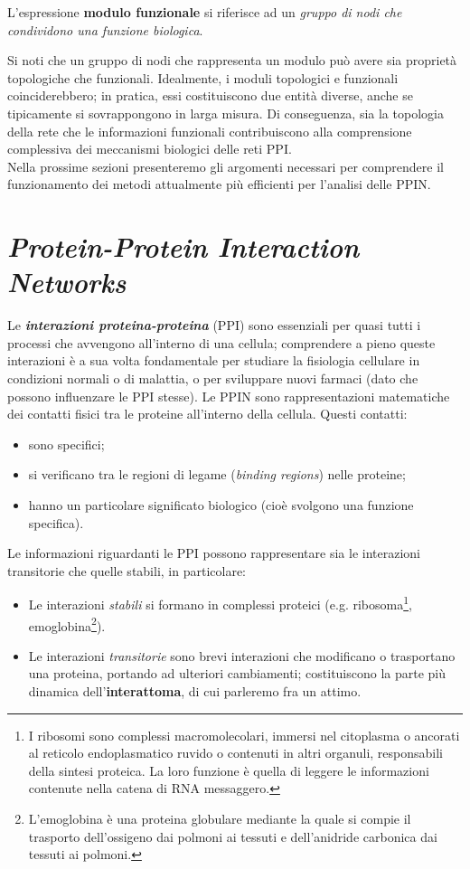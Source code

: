 \documentclass[11pt]{article}
\begin{document}
L'espressione \textbf{modulo funzionale} si riferisce ad un \textit{gruppo di nodi che condividono una funzione biologica}. 

Si noti che un gruppo di nodi che rappresenta un modulo può avere sia proprietà topologiche che funzionali. Idealmente, i moduli topologici e funzionali coinciderebbero; in pratica, essi costituiscono due entità diverse, anche se tipicamente si sovrappongono in larga misura. Di conseguenza, sia la topologia della rete che le informazioni funzionali contribuiscono alla comprensione complessiva dei meccanismi biologici delle reti PPI.\\

Nella prossime sezioni presenteremo gli argomenti necessari per comprendere il funzionamento dei metodi attualmente più efficienti per l'analisi delle PPIN.

\newpage
\section{\textit{Protein-Protein Interaction Networks}}
Le \textit{\textbf{interazioni proteina-proteina}} (PPI) sono essenziali per quasi tutti i processi che avvengono all'interno di una cellula; comprendere a pieno queste interazioni è a sua volta fondamentale per studiare la fisiologia cellulare in condizioni normali o di malattia, o per sviluppare nuovi farmaci (dato che possono influenzare le PPI stesse). Le PPIN sono rappresentazioni matematiche dei contatti fisici tra le proteine all'interno della cellula. Questi contatti:
\begin{itemize}
\setlength{\itemsep}{1pt}
  \setlength{\parskip}{0pt}
  \setlength{\parsep}{0pt}
\item sono specifici;
\item si verificano tra le regioni di legame (\textit{binding regions}) nelle proteine;
\item hanno un particolare significato biologico (cioè svolgono una funzione specifica).
\end{itemize}
Le informazioni riguardanti le PPI possono rappresentare sia le interazioni transitorie che quelle stabili, in particolare:
\begin{itemize}
\setlength{\itemsep}{1pt}
  \setlength{\parskip}{0pt}
  \setlength{\parsep}{0pt}
\item Le interazioni \textit{stabili} si formano in complessi proteici (e.g. ribosoma\footnote{I ribosomi sono complessi macromolecolari, immersi nel citoplasma o ancorati al reticolo endoplasmatico ruvido o contenuti in altri organuli, responsabili della sintesi proteica. La loro funzione è quella di leggere le informazioni contenute nella catena di RNA messaggero.}, emoglobina\footnote{L'emoglobina è una proteina globulare mediante la quale si compie il trasporto dell'ossigeno dai polmoni ai tessuti e dell'anidride carbonica dai tessuti ai polmoni.}).
\item Le interazioni \textit{transitorie} sono brevi interazioni che modificano o trasportano una proteina, portando ad ulteriori cambiamenti; costituiscono la parte più dinamica dell'\textbf{interattoma}, di cui parleremo fra un attimo.
\end{itemize}
\end{document}
